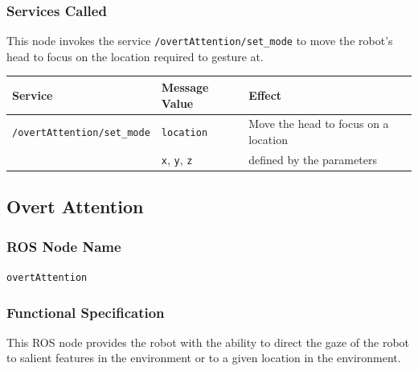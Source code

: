 \documentclass{CSSRforAfrica}
\begin{document}
{{\subsubsection*{Services Called}
This node  invokes the service {\small \verb+/overtAttention/set_mode+} to move the robot's head to focus on the location required to gesture at. 

\begin{center}
	\begin{tabularx}{\linewidth}{| l | l | X|}
		\hline 
		{\small Service }                                                                                & {\small Message Value}    &  {\small Effect}       \\
		\hline
		{\footnotesize \verb+/overtAttention/set_mode+ }  & {\footnotesize \verb+location+} & {\small Move the head to focus on a location } \\ 
		& {\footnotesize  \verb+x+, \verb+y+, \verb+z+ } &    defined by the parameters \\ 
		\hline
	\end{tabularx}
\end{center}










\newpage

\subsection{Overt Attention }

\subsubsection*{ROS Node Name}
 {\normalsize \verb+overtAttention+}   

\subsubsection*{Functional Specification}
This ROS node   provides the robot with the ability to direct the gaze of the robot  to salient features in the environment or to a given location in the environment. 

}}
\end{document}
